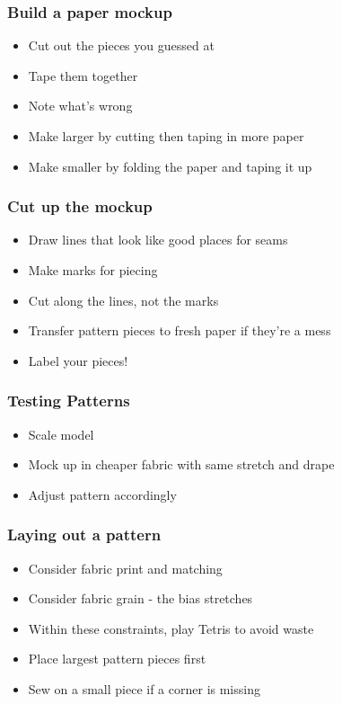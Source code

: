\documentclass{beamer}
\begin{document}
\begin{frame}[fragile]
\frametitle{Build a paper mockup}
\begin{itemize}
\item Cut out the pieces you guessed at
\item Tape them together
\item Note what's wrong
\item Make larger by cutting then taping in more paper
\item Make smaller by folding the paper and taping it up
\end{itemize}
\end{frame}

\begin{frame}[fragile]
\frametitle{Cut up the mockup}
\begin{itemize}
\item Draw lines that look like good places for seams
\item Make marks for piecing
\item Cut along the lines, not the marks
\item Transfer pattern pieces to fresh paper if they're a mess
\item Label your pieces!
\end{itemize}
\end{frame}

\begin{frame}[fragile]
\frametitle{Testing Patterns}
\begin{itemize}
\item Scale model
\item Mock up in cheaper fabric with same stretch and drape
\item Adjust pattern accordingly
\end{itemize}
\end{frame}

\begin{frame}[fragile]
\frametitle{Laying out a pattern}
\begin{itemize}
\item Consider fabric print and matching
\item Consider fabric grain - the bias stretches
\item Within these constraints, play Tetris to avoid waste
\item Place largest pattern pieces first
\item Sew on a small piece if a corner is missing
\end{itemize}
\end{frame}
\end{document}
